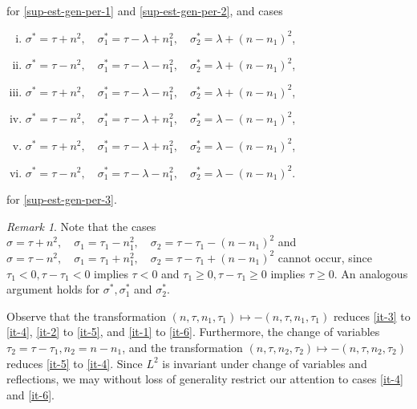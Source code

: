\documentclass[12pt,reqno]{amsart}
\numberwithin{equation}{section}  %
\numberwithin{figure}{section}
\theoremstyle{plain}
\theoremstyle{definition}
\theoremstyle{remark}
\newtheorem{remark}{Remark}
\begin{document}
%
for \eqref{sup-est-gen-per-1} and \eqref{sup-est-gen-per-2}, and cases
%
\begin{enumerate}[(i)]
\item $ \sigma^{*}=\tau+n^2,\quad \sigma^{*}_1=\tau - \lambda+n_1^2,\quad
  \sigma^{*}_2=\lambda+(n - n_1)^2$, \label{it-1-star} \item $
  \sigma^{*}=\tau-n^2,\quad \sigma^{*}_1=\tau - \lambda-n_1^2,\quad
  \sigma^{*}_2=\lambda+(n - n_1)^2$, \label{it-2-star} \item
  $\sigma^{*}=\tau+n^2,\quad \sigma^{*}_1=\tau - \lambda-n_1^2,\quad
  \sigma^{*}_2=\lambda+(n - n_1)^2$, \label{it-3-star} \item
  $\sigma^{*}=\tau-n^2,\quad \sigma^{*}_1=\tau - \lambda+n_1^2,\quad
  \sigma^{*}_2=\lambda-(n - n_1)^2$, \label{it-4-star} \item
  $\sigma^{*}=\tau+n^2,\quad \sigma^{*}_1=\tau - \lambda+n_1^2,\quad
  \sigma^{*}_2=\lambda-(n - n_1)^2$, \label{it-5-star} \item
  $\sigma^{*}=\tau-n^2,\quad \sigma^{*}_1=\tau - \lambda-n_1^2,\quad
  \sigma^{*}_2= \lambda-(n - n_1)^2$.  \label{it-6-star}
  \end{enumerate}
for \eqref{sup-est-gen-per-3}.
%
%
\begin{framed}
\begin{remark}
Note that the cases $\sigma=\tau+n^2,\quad \sigma_1=\tau_1-n_1^2,\quad
\sigma_2=\tau - \tau_1-(n - n_1)^2$ and $\sigma=\tau-n^2,\quad
\sigma_1=\tau_1+n_1^2,\quad \sigma_2=\tau - \tau_1+(n - n_1)^2$ cannot occur, since
$\tau_1< 0, \tau-\tau_1< 0$ implies $\tau<0$ and $\tau_1\geq 0, \tau-\tau_1\geq
0$ implies $\tau\geq 0$. An analogous argument holds for $\sigma^{*},
\sigma_{1}^{*}$ and $\sigma_{2}^{*}$.
\end{remark}
\end{framed}
%
Observe that the transformation $(n, \tau, n_{1}, \tau_{1}) \mapsto -(n, \tau,
n_{1}, \tau_{1})$ reduces \eqref{it-3} to \eqref{it-4}, \eqref{it-2} to
\eqref{it-5}, and \eqref{it-1} to \eqref{it-6}. Furthermore, the change of
variables $\tau_{2} = \tau - \tau_{1}, n_{2} = n - n_{1}$, and the
transformation $(n, \tau, n_{2}, \tau_{2}) \mapsto - (n, \tau, n_{2},
\tau_{2})$ reduces \eqref{it-5} to \eqref{it-4}. Since $L^{2}$ is invariant
under change of variables and reflections, we may without loss of generality
restrict our attention to cases \eqref{it-4} and \eqref{it-6}.
\end{document}
